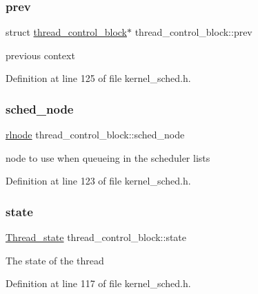 \subsubsection{\texorpdfstring{prev}{prev}}
{\footnotesize\ttfamily struct \hyperlink{structthread__control__block}{thread\+\_\+control\+\_\+block}$\ast$ thread\+\_\+control\+\_\+block\+::prev}

previous context 

Definition at line 125 of file kernel\+\_\+sched.\+h.

\mbox{\label{structthread__control__block_add433b079e04053fe70fdd2b92e1d6ad}} 
\subsubsection{\texorpdfstring{sched\+\_\+node}{sched\_node}}
{\footnotesize\ttfamily \hyperlink{group__rlists_ga8f6244877f7ce2322c90525217ea6e7a}{rlnode} thread\+\_\+control\+\_\+block\+::sched\+\_\+node}

node to use when queueing in the scheduler lists 

Definition at line 123 of file kernel\+\_\+sched.\+h.

\mbox{\label{structthread__control__block_affd872365cf4768fa1c9bd1e196bb97c}} 
\subsubsection{\texorpdfstring{state}{state}}
{\footnotesize\ttfamily \hyperlink{group__scheduler_ga6c969c169777f82c104cf73e501df70f}{Thread\+\_\+state} thread\+\_\+control\+\_\+block\+::state}

The state of the thread 

Definition at line 117 of file kernel\+\_\+sched.\+h.

\mbox{\label{structthread__control__block_a91a73f2ad3f727b7412b912b3d65109a}} 
